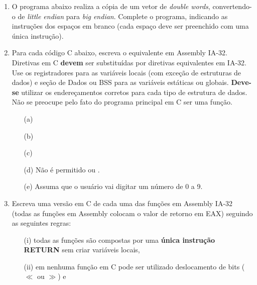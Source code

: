 \begin{enumerate}[resume]
    \item
    O programa abaixo realiza a cópia de um vetor de \textit{double words}, 
    convertendo-o de \textit{little endian} para \textit{big endian}.
    Complete o programa, indicando as instruções dos espaços em branco 
    (cada espaço deve ser preenchido com uma única instrução).


    \item
    Para cada código C abaixo, escreva o equivalente em Assembly IA-32.
    Diretivas em C \textbf{devem} ser substituídas por diretivas equivalentes em IA-32.
    Use os registradores para as variáveis locais (com exceção de estruturas de dados)
    e seção de Dados ou BSS para as variáveis estáticas ou globais.
    \textbf{Deve-se} utilizar os endereçamentos corretos 
    para cada tipo de estrutura de dados.
    Não se preocupe pelo fato do programa principal em C ser uma função.
    \begin{itemize}
        \item [(a)] 
        \item [(b)] 
        \item [(c)] 
        \item [(d)] Não é permitido  ou .
        \item [(e)] Assuma que o usuário vai digitar um número de 0 a 9.
    \end{itemize}

    \item
    Escreva uma versão em C de cada uma das funções em Assembly IA-32
    (todas as funções em Assembly colocam o valor de retorno em EAX)
    seguindo as seguintes regras:
    \begin{enumerate}
        \item [(i)]
        todas as funções são compostas por uma \textbf{única instrução RETURN}
        sem criar variáveis locais,
        
        \item [(ii)]
        em nenhuma função em C pode ser utilizado deslocamento de bits 
        ($\ll$ ou $\gg$) e


\end{enumerate}
\end{enumerate}
